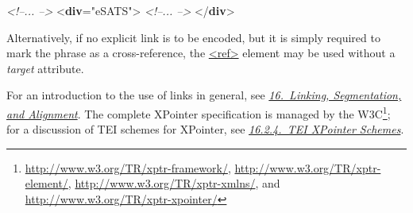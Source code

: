 \begin{shaded}
\textit{<!--... -->}\mbox{}\newline 
{<\textbf{div}\hspace*{1em}{xml:id}="{eSATS}">}\mbox{}\newline 
\textit{<!--... -->}\mbox{}\newline 
{</\textbf{div}>}\end{shaded}\egroup\par \noindent  Alternatively, if no explicit link is to be encoded, but it is simply required to mark the phrase as a cross-reference, the \hyperref[TEI.ref]{<ref>} element may be used without a {\itshape target} attribute.\par
For an introduction to the use of links in general, see \textit{\hyperref[SA]{16.\ Linking, Segmentation, and Alignment}}. The complete XPointer specification is managed by the W3C\footnote{\url{http://www.w3.org/TR/xptr-framework/}, \url{http://www.w3.org/TR/xptr-element/}, \url{http://www.w3.org/TR/xptr-xmlns/}, and \url{http://www.w3.org/TR/xptr-xpointer/}}; for a discussion of TEI schemes for XPointer, see \textit{\hyperref[SATS]{16.2.4.\ TEI XPointer Schemes}}.\par


